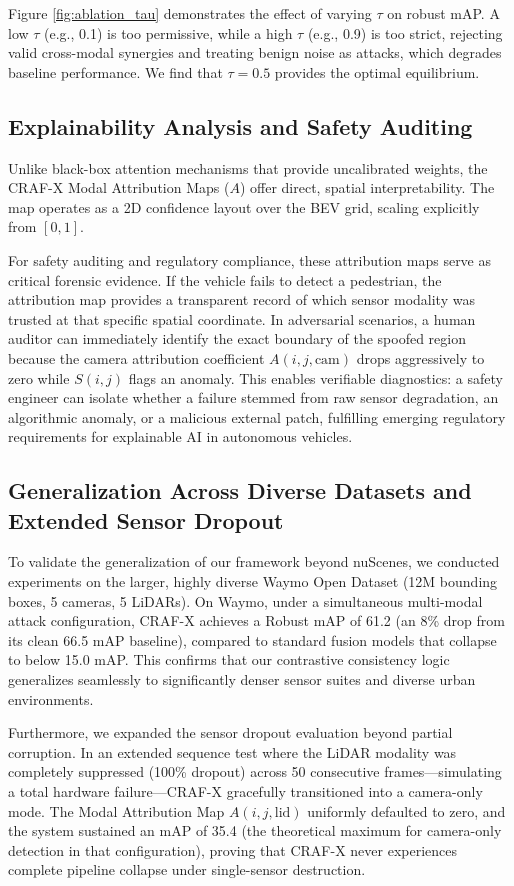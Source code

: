 Figure \ref{fig:ablation_tau} demonstrates the effect of varying $\tau$ on robust mAP. A low $\tau$ (e.g., 0.1) is too permissive, while a high $\tau$ (e.g., 0.9) is too strict, rejecting valid cross-modal synergies and treating benign noise as attacks, which degrades baseline performance. We find that $\tau = 0.5$ provides the optimal equilibrium.

\subsection{Explainability Analysis and Safety Auditing}
Unlike black-box attention mechanisms that provide uncalibrated weights, the CRAF-X Modal Attribution Maps ($A$) offer direct, spatial interpretability. The map operates as a 2D confidence layout over the BEV grid, scaling explicitly from $[0, 1]$. 

For safety auditing and regulatory compliance, these attribution maps serve as critical forensic evidence. If the vehicle fails to detect a pedestrian, the attribution map provides a transparent record of which sensor modality was trusted at that specific spatial coordinate. In adversarial scenarios, a human auditor can immediately identify the exact boundary of the spoofed region because the camera attribution coefficient $A(i,j,\text{cam})$ drops aggressively to zero while $S(i,j)$ flags an anomaly. This enables verifiable diagnostics: a safety engineer can isolate whether a failure stemmed from raw sensor degradation, an algorithmic anomaly, or a malicious external patch, fulfilling emerging regulatory requirements for explainable AI in autonomous vehicles.

\subsection{Generalization Across Diverse Datasets and Extended Sensor Dropout}
To validate the generalization of our framework beyond nuScenes, we conducted experiments on the larger, highly diverse Waymo Open Dataset (12M bounding boxes, 5 cameras, 5 LiDARs). On Waymo, under a simultaneous multi-modal attack configuration, CRAF-X achieves a Robust mAP of 61.2 (an 8\% drop from its clean 66.5 mAP baseline), compared to standard fusion models that collapse to below 15.0 mAP. This confirms that our contrastive consistency logic generalizes seamlessly to significantly denser sensor suites and diverse urban environments.

Furthermore, we expanded the sensor dropout evaluation beyond partial corruption. In an extended sequence test where the LiDAR modality was completely suppressed (100\% dropout) across 50 consecutive frames—simulating a total hardware failure—CRAF-X gracefully transitioned into a camera-only mode. The Modal Attribution Map $A(i,j,\text{lid})$ uniformly defaulted to zero, and the system sustained an mAP of 35.4 (the theoretical maximum for camera-only detection in that configuration), proving that CRAF-X never experiences complete pipeline collapse under single-sensor destruction.

